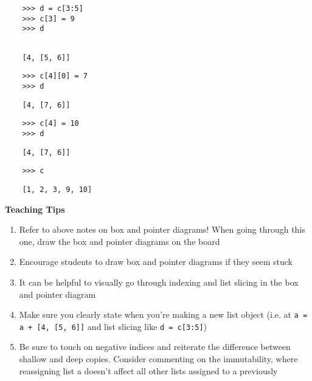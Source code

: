     \begin{blocksection}
    
    \begin{lstlisting}
    >>> d = c[3:5]
    >>> c[3] = 9
    >>> d
    
    \end{lstlisting}
    \begin{solution}[.25in]
    \begin{lstlisting}
    [4, [5, 6]]
    \end{lstlisting}
    \end{solution}
    
    \begin{lstlisting}
    >>> c[4][0] = 7
    >>> d
    \end{lstlisting}
    \begin{solution}[.25in]
    \begin{lstlisting}
    [4, [7, 6]]
    \end{lstlisting}
    \end{solution}
    
    \begin{lstlisting}
    >>> c[4] = 10
    >>> d
    \end{lstlisting}
    \begin{solution}[.25in]
    \begin{lstlisting}
    [4, [7, 6]]
    \end{lstlisting}
    \end{solution}
    
    \begin{lstlisting}
    >>> c
    \end{lstlisting}
    \begin{solution}[.25in]
    \begin{lstlisting}
    [1, 2, 3, 9, 10]
    \end{lstlisting}
    \end{solution}
    
    \end{blocksection}
    
    \begin{questionmeta}
        \textbf{Teaching Tips}
        \begin{enumerate}
                \item Refer to above notes on box and pointer diagrams! When going through this one, draw the box and pointer diagrams on the board
                \item Encourage students to draw box and pointer diagrams if they seem stuck
                \item It can be helpful to visually go through indexing and list slicing in the box and pointer diagram
                \item Make sure you clearly state when you’re making a new list object (i.e. at \texttt{a = a + [4, [5, 6]]} and list slicing like \texttt{d = c[3:5]})
                \item Be sure to touch on negative indices and reiterate the difference between shallow and deep copies. Consider commenting on the immutability, where reassigning list a doesn't affect all other lists assigned to a previously
        \end{enumerate}
    \end{questionmeta}